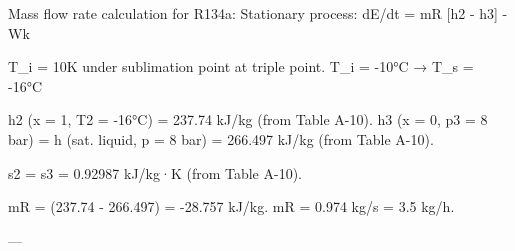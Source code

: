 Mass flow rate calculation for R134a:  
Stationary process:  
dE/dt = mR [h2 - h3] - Wk  

T_i = 10K under sublimation point at triple point.  
T_i = -10°C → T_s = -16°C  

h2 (x = 1, T2 = -16°C) = 237.74 kJ/kg (from Table A-10).  
h3 (x = 0, p3 = 8 bar) = h (sat. liquid, p = 8 bar) = 266.497 kJ/kg (from Table A-10).  

s2 = s3 = 0.92987 kJ/kg·K (from Table A-10).  

mR = (237.74 - 266.497) = -28.757 kJ/kg.  
mR = 0.974 kg/s = 3.5 kg/h.  

---